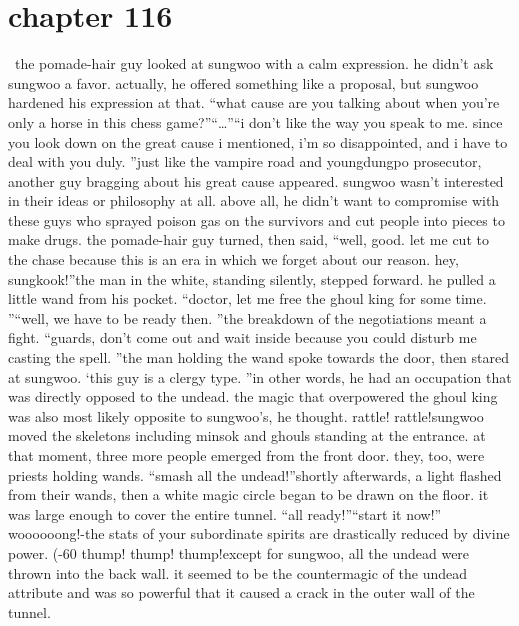\section{chapter 116}






 the pomade-hair guy looked at sungwoo with a calm expression.
 he didn’t ask sungwoo a favor.
 actually, he offered something like a proposal, but sungwoo hardened his expression at that.
“what cause are you talking about when you’re only a horse in this chess game?”“…”“i don’t like the way you speak to me.
 since you look down on the great cause i mentioned, i’m so disappointed, and i have to deal with you duly.
”just like the vampire road and youngdungpo prosecutor, another guy bragging about his great cause appeared.
 sungwoo wasn’t interested in their ideas or philosophy at all.
above all, he didn’t want to compromise with these guys who sprayed poison gas on the survivors and cut people into pieces to make drugs.
the pomade-hair guy turned, then said, “well, good.
 let me cut to the chase because this is an era in which we forget about our reason.
 hey, sungkook!”the man in the white, standing silently, stepped forward.
 he pulled a little wand from his pocket.
“doctor, let me free the ghoul king for some time.
”“well, we have to be ready then.
”the breakdown of the negotiations meant a fight.
“guards, don’t come out and wait inside because you could disturb me casting the spell.
”the man holding the wand spoke towards the door, then stared at sungwoo.
‘this guy is a clergy type.
”in other words, he had an occupation that was directly opposed to the undead.
 the magic that overpowered the ghoul king was also most likely opposite to sungwoo’s, he thought.
rattle! rattle!sungwoo moved the skeletons including minsok and ghouls standing at the entrance.
 at that moment, three more people emerged from the front door.
 they, too, were priests holding wands.
“smash all the undead!”shortly afterwards, a light flashed from their wands, then a white magic circle began to be drawn on the floor.
 it was large enough to cover the entire tunnel.
“all ready!”“start it now!”
woooooong!-the stats of your subordinate spirits are drastically reduced by divine power.
 (-60%
thump! thump! thump!except for sungwoo, all the undead were thrown into the back wall.
it seemed to be the countermagic of the undead attribute and was so powerful that it caused a crack in the outer wall of the tunnel.
